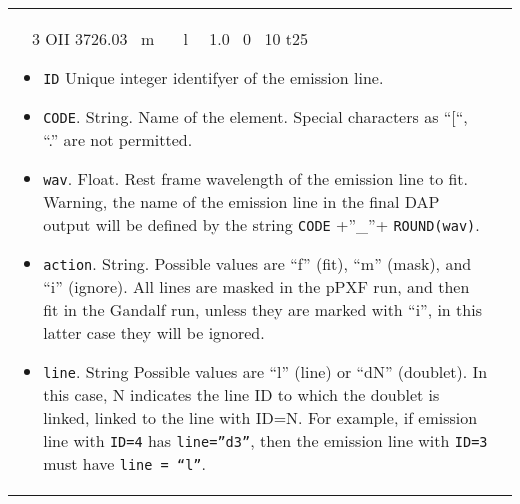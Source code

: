 \begin{center}
\begin{longtable}{p{2.7cm}| p{11.1cm}}
{                    \ \  3   OII  3726.03   \ m  \ \ \ l   \ \  1.0 \	   0 \	10 	t25 }

                     \medskip

                     \begin{itemize}
                       \item {\tt ID} Unique integer identifyer of the emission line.

                       \item {\tt CODE}. String. Name of the element. Special characters as ``[``, ``.'' are not permitted.

                       \item {\tt wav}. Float. Rest frame wavelength of the emission line to fit. Warning, the
                         name of the emission line in the final DAP output will be defined by the string {\tt CODE} +''\_''+ {\tt ROUND(wav)}.

                         \item {\tt action}. String. Possible values are ``f'' (fit), ``m'' (mask), and ``i''
                           (ignore). All lines are masked in the pPXF run, and then fit in the Gandalf run,
                           unless they are marked with ``i'', in this latter case they will be ignored.

                        \item {\tt line}. String Possible values are ``l'' (line) or ``dN'' (doublet). In this
                          case, N indicates the line ID to which the  doublet is linked, linked to the line with
                          ID=N. For example, if emission line with {\tt ID=4} has {\tt line=''d3''}, then the 
                          emission line with {\tt ID=3} must have {\tt line = ``l''}.


\end{itemize}
\end{longtable}
\end{center}
